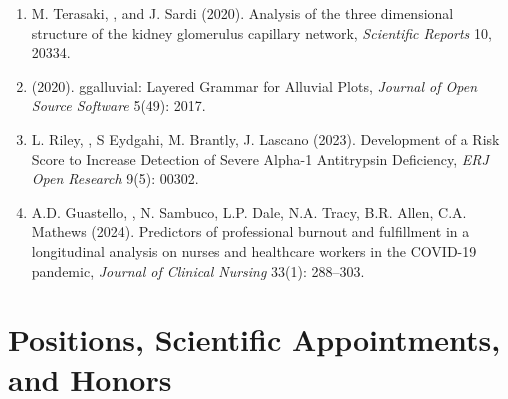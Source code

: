 \documentclass{nihbiosketch}
\begin{document}
\begin{statement}
\begin{enumerate}
\item M. Terasaki, , and J. Sardi (2020). Analysis of the three dimensional structure of the kidney glomerulus capillary network, \emph{Scientific Reports} 10, 20334.
\item {} (2020). ggalluvial: Layered Grammar for Alluvial Plots, \emph{Journal of Open Source Software} 5(49): 2017.
\item L. Riley, , S Eydgahi, M. Brantly, J. Lascano (2023). Development of a Risk Score to Increase Detection of Severe Alpha-1 Antitrypsin Deficiency, \emph{ERJ Open Research} 9(5): 00302.
\item A.D. Guastello, , N. Sambuco, L.P. Dale, N.A. Tracy, B.R. Allen, C.A. Mathews (2024). Predictors of professional burnout and fulfillment in a longitudinal analysis on nurses and healthcare workers in the COVID-19 pandemic, \emph{Journal of Clinical Nursing} 33(1): 288--303.

\end{enumerate}

\end{statement}


\section{Positions, Scientific Appointments, and Honors}
\end{document}
